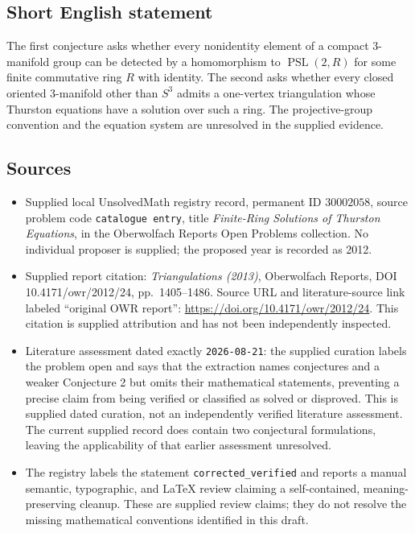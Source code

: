 \documentclass[11pt]{article}
\begin{document}
\subsection{Short English statement}
The first conjecture asks whether every nonidentity element of a compact \(3\)-manifold group can be detected by a homomorphism to \(\operatorname{PSL}(2,R)\) for some finite commutative ring \(R\) with identity. The second asks whether every closed oriented \(3\)-manifold other than \(S^3\) admits a one-vertex triangulation whose Thurston equations have a solution over such a ring. The projective-group convention and the equation system are unresolved in the supplied evidence.
\subsection{Sources}
\begin{itemize}
\item Supplied local UnsolvedMath registry record, permanent ID \(30002058\), source problem code \texttt{catalogue entry}, title \emph{Finite-Ring Solutions of Thurston Equations}, in the Oberwolfach Reports Open Problems collection. No individual proposer is supplied; the proposed year is recorded as 2012.
\item Supplied report citation: \emph{Triangulations (2013)}, Oberwolfach Reports, DOI 10.4171/owr/2012/24, pp.~1405--1486. Source URL and literature-source link labeled ``original OWR report'': \url{https://doi.org/10.4171/owr/2012/24}. This citation is supplied attribution and has not been independently inspected.
\item Literature assessment dated exactly \texttt{2026-08-21}: the supplied curation labels the problem open and says that the extraction names conjectures and a weaker Conjecture 2 but omits their mathematical statements, preventing a precise claim from being verified or classified as solved or disproved. This is supplied dated curation, not an independently verified literature assessment. The current supplied record does contain two conjectural formulations, leaving the applicability of that earlier assessment unresolved.
\item The registry labels the statement \texttt{corrected\_verified} and reports a manual semantic, typographic, and LaTeX review claiming a self-contained, meaning-preserving cleanup. These are supplied review claims; they do not resolve the missing mathematical conventions identified in this draft.
\end{itemize}
\end{document}
